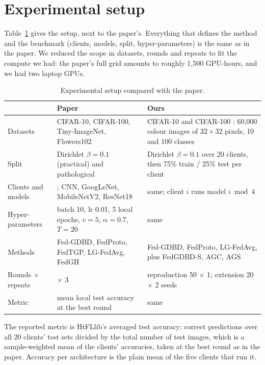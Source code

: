 \section{Experimental setup}

Table~\ref{tab:setup} gives the setup, next to the paper's. Everything that defines the method and the benchmark (clients, models, split, hyper-parameters) is the same as in the paper. We reduced the scope in datasets, rounds and repeats to fit the compute we had: the paper's full grid amounts to roughly 1,500 GPU-hours, and we had two laptop GPUs.

\begin{table}[htbp]
\centering
\caption[Experimental setup compared with the paper]{Experimental setup compared with the paper.}
\label{tab:setup}
\small
\begin{tabularx}{\textwidth}{>{\raggedright\arraybackslash}p{3.0cm}>{\raggedright\arraybackslash}X>{\raggedright\arraybackslash}X}
\toprule
 & Paper \cite{zhang2025gdbd} & Ours \\
\midrule
Datasets & CIFAR-10, CIFAR-100, Tiny-ImageNet, Flowers102 & CIFAR-10 and CIFAR-100 \cite{krizhevsky2009cifar}: 60,000 colour images of $32\times32$ pixels, 10 and 100 classes \\
Split & Dirichlet $\beta=0.1$ (practical) and pathological & Dirichlet $\beta=0.1$ over 20 clients, then 75\% train / 25\% test per client \\
Clients and models & 20; CNN, GoogLeNet, MobileNetV2, ResNet18 & same; client $i$ runs model $i \bmod 4$ \\
Hyper-parameters & batch 10, lr 0.01, 5 local epochs, $v=5$, $\alpha=0.7$, $T=20$ & same \\
Methods & Fed-GDBD, FedProto, FedTGP, LG-FedAvg, FedGH & Fed-GDBD, FedProto, LG-FedAvg, plus FedGDBD-S, AGC, AGS \\
Rounds $\times$ repeats & 100 $\times$ 3 & reproduction 50 $\times$ 1; extension 20 $\times$ 2 seeds \\
Metric & mean local test accuracy at the best round & same \\
\bottomrule
\end{tabularx}
\end{table}

The reported metric is HtFLlib's averaged test accuracy: correct predictions over all 20 clients' test sets divided by the total number of test images, which is a sample-weighted mean of the clients' accuracies, taken at the best round as in the paper. Accuracy per architecture is the plain mean of the five clients that run it.

